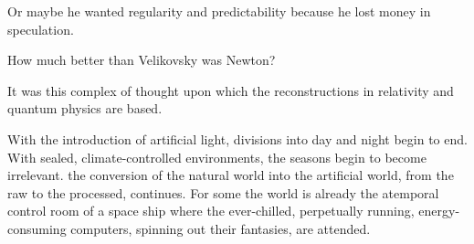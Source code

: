 Or maybe he wanted regularity and predictability because he lost money in speculation.

How much better than Velikovsky was Newton?

It was this complex of thought upon which the reconstructions in relativity and quantum physics are based.

With the introduction of artificial light, divisions into day and night begin to end. With sealed, climate-controlled environments, the seasons begin to become irrelevant. the conversion of the natural world into the artificial world, from the raw to the processed, continues. For some the world is already the atemporal control room of a space ship where the ever-chilled, perpetually running, energy-consuming computers, spinning out their fantasies, are attended.
